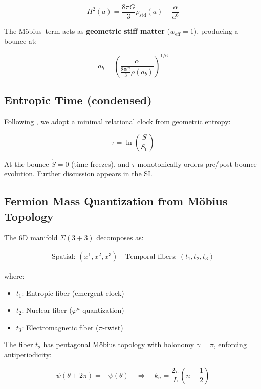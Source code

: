 \documentclass[12pt]{article}
\newcommand{\Moebius}{M\"obius}
\newcommand{\SigMoeb}{\Sigma\text{--}\Moebius}
\begin{document}
\begin{equation}
\boxed{H^2(a) = \frac{8\pi G}{3}\rho_{\text{std}}(a) - \frac{\alpha}{a^6}}
\end{equation}

The \SigMoeb\ term acts as \textbf{geometric stiff matter} ($w_{\text{eff}} = 1$), producing a bounce at:

\begin{equation}
a_b = \left(\frac{\alpha}{\frac{8\pi G}{3}\rho(a_b)}\right)^{1/6}
\end{equation}

\subsection{Entropic Time (condensed)}

Following \cite{rovelli2004,thooft1996}, we adopt a minimal relational clock from geometric entropy:

\begin{equation}
\boxed{\tau = \ln\!\left(\frac{S}{S_0}\right)}
\end{equation}

At the bounce $\dot{S}=0$ (time freezes), and $\tau$ monotonically orders pre/post-bounce evolution. Further discussion appears in the SI.

\subsection{Fermion Mass Quantization from M\"obius Topology}

The 6D manifold $\Sigma(3+3)$ decomposes as:

\begin{align}
\text{Spatial: } (x^1, x^2, x^3) \quad \text{Temporal fibers: } (t_1, t_2, t_3)
\end{align}

where:
\begin{itemize}
\item \textbf{$t_1$}: Entropic fiber (emergent clock)
\item \textbf{$t_2$}: Nuclear fiber ($\varphi^n$ quantization)
\item \textbf{$t_3$}: Electromagnetic fiber ($\pi$-twist)
\end{itemize}

The fiber $t_2$ has pentagonal M\"obius topology with holonomy $\gamma = \pi$, enforcing antiperiodicity:

\begin{equation}
\psi(\theta + 2\pi) = -\psi(\theta) \quad \Rightarrow \quad k_n = \frac{2\pi}{L}\left(n - \frac{1}{2}\right)
\end{equation}
\end{document}
